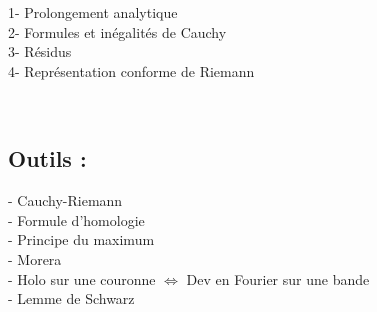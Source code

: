 \documentclass[12pt,a4paper]{article}
\begin{document}
1- Prolongement analytique \\

2- Formules et inégalités de Cauchy \\

3- Résidus \\

4- Représentation conforme de Riemann

~\\

\subsection*{Outils :}
- Cauchy-Riemann \\

- Formule d'homologie \\

- Principe du maximum \\

- Morera \\

- Holo sur une couronne $\Leftrightarrow$ Dev en Fourier sur une bande \\

- Lemme de Schwarz \\
\end{document}
